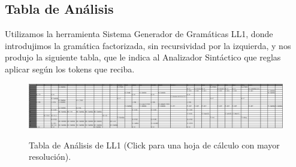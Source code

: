 \documentclass{article}[a4paper]
\begin{document}
\subsection{Tabla de Análisis}
Utilizamos la herramienta Sistema Generador de Gramáticas LL1, donde introdujimos la gramática factorizada, sin recursividad por la izquierda, y nos produjo la siguiente tabla, que le indica al Analizador Sintáctico que reglas aplicar según los tokens que reciba.
\begin{figure}[h!]
\centering
\href{https://docs.google.com/spreadsheets/d/17yF_afvRGqVFFo7q70U3LPK74hVvpB8d/edit?usp=sharing&ouid=100176091217744756260&rtpof=true&sd=true}{\includegraphics[width=1\textwidth]{tablaM.png}}
\caption{\label{figura:tablaM}Tabla de Análisis de LL1 (Click para una hoja de cálculo con mayor resolución).}
\end{figure}
\end{document}
